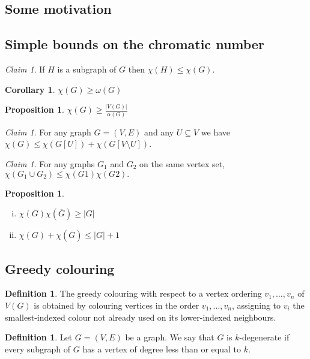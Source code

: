 \documentclass[11pt, fleqn, a4paper, landscape]{article}
\theoremstyle{plain} %
\newtheorem{pro}[thm]{Proposition}
\newtheorem{cor}[thm]{Corollary}
\theoremstyle{remark} %
\newtheorem{claim}[thm]{Claim}
\theoremstyle{definition} %
\newtheorem{defi}[thm]{Definition}
\begin{document}
\begin{multicols}{3}
\subsection{Some motivation}
\addtocounter{thm}{1}\addtocounter{thm}{1}
\subsection{Simple bounds on the chromatic number}
\begin{claim}
If $H$ is a subgraph of $G$ then $\chi(H) \le \chi(G)$.
\end{claim}

\begin{cor}
$\chi(G) \ge \omega(G)$
\end{cor}
\addtocounter{thm}{1}
\begin{pro}
$\chi(G) \ge\frac{|V (G)|}{\alpha(G)}$
\end{pro}

\begin{claim}
For any graph $G = (V,E)$ and any $U \subseteq V$ we have $\chi(G) \le \chi(G[U]) + \chi(G[V \setminus U])$.
\end{claim}

\begin{claim}
For any graphs $G_1$ and $G_2$ on the same vertex set, $\chi(G_1 \cup G_2) \le \chi(G1)\chi(G2).$
\end{claim}


\begin{pro}
\begin{enumerate}[(i)]
\item $\chi(G)\chi(\overline{G})\ge |G|$
\item $\chi(G)+\chi(\overline{G})\le |G|+1$
\end{enumerate}
\end{pro}

\subsection{Greedy colouring}

\begin{defi}
The greedy colouring with respect to a vertex ordering $v_1, \dots , v_n$ of $V (G)$ is obtained by colouring vertices in the order $v_1, \dots , v_n$, assigning to $v_i$ the smallest-indexed colour not already used on its lower-indexed neighbours.
\end{defi}
\addtocounter{thm}{1}
\begin{defi}
Let $G = (V,E)$ be a graph. We say that $G$ is $k$-degenerate if every subgraph of $G$ has a vertex of degree less than or equal to $k$.
\end{defi}


\end{multicols}
\end{document}
